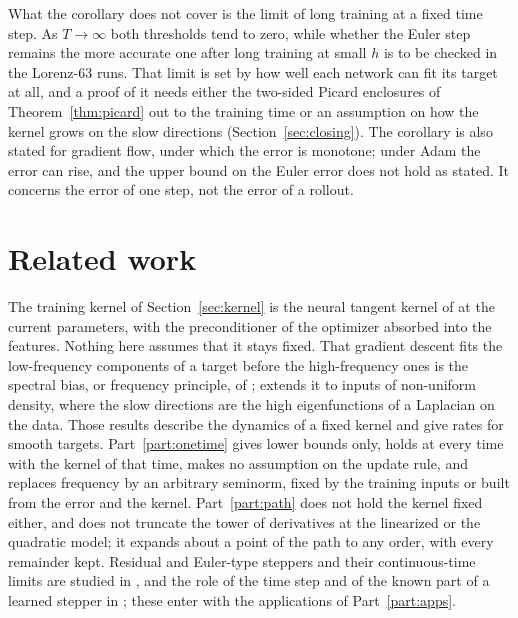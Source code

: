 \documentclass[11pt]{article}
\theoremstyle{definition}
\theoremstyle{remark}
\begin{document}
What the corollary does not cover is the limit of long training at a fixed time step.
As $T\to\infty$ both thresholds tend to zero, while whether the Euler step remains the more accurate one after long training at small $h$ is to be checked in the Lorenz-63 runs.
That limit is set by how well each network can fit its target at all, and a proof of it needs either the two-sided Picard enclosures of Theorem~\ref{thm:picard} out to the training time or an assumption on how the kernel grows on the slow directions (Section~\ref{sec:closing}).
The corollary is also stated for gradient flow, under which the error is monotone; under Adam the error can rise, and the upper bound on the Euler error does not hold as stated.
It concerns the error of one step, not the error of a rollout.

\section*{Related work}\label{sec:related}

The training kernel of Section~\ref{sec:kernel} is the neural tangent kernel of \cite{jacot2018} at the current parameters, with the preconditioner of the optimizer absorbed into the features.
Nothing here assumes that it stays fixed.
That gradient descent fits the low-frequency components of a target before the high-frequency ones is the spectral bias, or frequency principle, of \cite{rahaman2019,basri2019,xu2020}; \cite{basri2020} extends it to inputs of non-uniform density, where the slow directions are the high eigenfunctions of a Laplacian on the data.
Those results describe the dynamics of a fixed kernel and give rates for smooth targets.
Part~\ref{part:onetime} gives lower bounds only, holds at every time with the kernel of that time, makes no assumption on the update rule, and replaces frequency by an arbitrary seminorm, fixed by the training inputs or built from the error and the kernel.
Part~\ref{part:path} does not hold the kernel fixed either, and does not truncate the tower of derivatives at the linearized or the quadratic model; it expands about a point of the path to any order, with every remainder kept.
Residual and Euler-type steppers and their continuous-time limits are studied in \cite{chen2018}, and the role of the time step and of the known part of a learned stepper in \cite{krishnapriyan2023}; these enter with the applications of Part~\ref{part:apps}.
\end{document}
